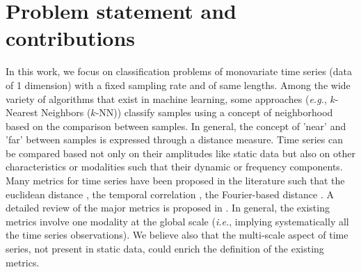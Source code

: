 \section*{Problem statement and contributions}
In this work, we focus on classification problems of monovariate time series (data of 1 dimension) with a fixed sampling rate and of same lengths. Among the wide variety of algorithms that exist in machine learning, some approaches (\textit{e.g.}, $k$-Nearest Neighbors ($k$-NN)) classify samples using a concept of neighborhood based on the comparison between samples. In general, the concept of 'near' and 'far' between samples is expressed through a distance measure. Time series can be compared based not only on their amplitudes like static data but also on other characteristics or modalities such that their dynamic or frequency components. Many metrics for time series have been proposed in the literature such that the euclidean distance \cite{Ding2008}, the temporal correlation \cite{Frambourg2013}, the Fourier-based distance \cite{Sahidullah2012a}. A detailed review of the major metrics is proposed in \cite{Montero2014}. In general, the existing metrics involve one modality at the global scale (\textit{i.e.}, implying systematically all the time series observations). We believe also that the multi-scale aspect of time series, not present in static data, could enrich the definition of the existing metrics. 

